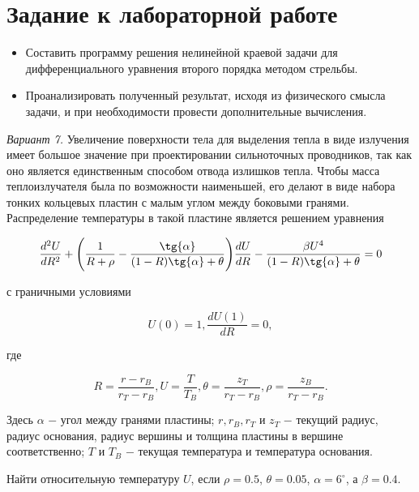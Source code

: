 \documentclass[a4paper,12pt]{article}
\begin{document}


\section{\normalsize{Задание к лабораторной работе}}
\begin{flushleft}
    \begin{itemize}
        \item Составить программу решения нелинейной краевой задачи для дифференциального уравнения второго порядка методом стрельбы.
        \item Проанализировать полученный результат, исходя из физического смысла задачи, и при необходимости провести дополнительные вычисления.
    \end{itemize}
\end{flushleft}
\begin{flushleft}
    \textit{Вариант 7.}\linebreak
    Увеличение поверхности тела для выделения тепла в виде излучения имеет большое значение при проектировании сильноточных проводников, так как оно является
    единственным способом отвода излишков тепла. Чтобы масса теплоизлучателя была по возможности наименьшей, его делают в виде набора тонких кольцевых пластин
    с малым углом между боковыми гранями. Распределение температуры в такой пластине является решением уравнения

    \begin{equation}\label{eq:sys}
      \frac{d^2U}{dR^2} + \Bigg(\frac{1}{R + \rho} - \frac{\tg{\alpha}}{(1-R)\tg{\alpha} + \theta}\Bigg)\frac{dU}{dR} - \frac{\beta U^4}{(1-R)\tg{\alpha}+\theta} = 0
    \end{equation}

    с граничными условиями

    \begin{equation}\label{eq:cond}
      U(0) = 1, \frac{dU(1)}{dR} = 0,
    \end{equation}

    где 

    \begin{equation}\label{eq:where}
      R = \frac{r - r_B}{r_T - r_B}, U = \frac{T}{T_B}, \theta = \frac{z_T}{r_T - r_B}, \rho = \frac{z_B}{r_T - r_B}.
    \end{equation}

    Здесь $\alpha$ $-$ угол между гранями пластины; $r, r_B, r_T$ и $z_T$ $-$ текущий радиус, радиус основания, радиус вершины и толщина пластины в вершине соответственно;
    $T$ и $T_B$ $-$ текущая температура и температура основания.\linebreak

    Найти относительную температуру $U$, если $\rho = 0.5$, $\theta = 0.05$, $\alpha = 6^{\circ}$, а $\beta = 0.4$.
\end{flushleft}
\end{document}
